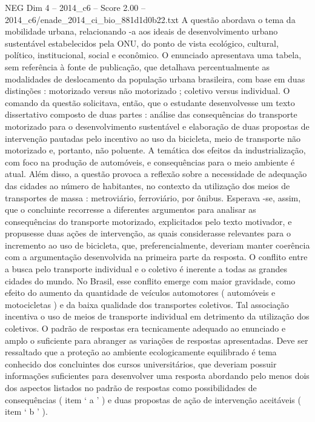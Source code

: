 \begin{textsample}{NEG Dim 4 – 2014\_c6 – Score 2.00 – 2014\_c6/enade\_2014\_ci\_bio\_881d1d0b22.txt}
A questão abordava o tema da mobilidade urbana, relacionando -a aos ideais de desenvolvimento urbano sustentável estabelecidos pela ONU, do ponto de vista ecológico, cultural, político, institucional, social e econômico.
O enunciado apresentava uma tabela, sem referência à fonte de publicação, que detalhava percentualmente as modalidades de deslocamento da população urbana brasileira, com base em duas distinções : motorizado versus não motorizado ; coletivo versus individual.
O comando da questão solicitava, então, que o estudante desenvolvesse um texto dissertativo composto de duas partes : análise das consequências do transporte motorizado para o desenvolvimento sustentável e elaboração de duas propostas de intervenção pautadas pelo incentivo ao uso da bicicleta, meio de transporte não motorizado e, portanto, não poluente.
A temática dos efeitos da industrialização, com foco na produção de automóveis, e consequências para o meio ambiente é atual.
Além disso, a questão provoca a reflexão sobre a necessidade de adequação das cidades ao número de habitantes, no contexto da utilização dos meios de transportes de massa : metroviário, ferroviário, por ônibus.
Esperava -se, assim, que o concluinte recorresse a diferentes argumentos para analisar as consequências do transporte motorizado, explicitados pelo texto motivador, e propusesse duas ações de intervenção, as quais considerasse relevantes para o incremento ao uso de bicicleta, que, preferencialmente, deveriam manter coerência com a argumentação desenvolvida na primeira parte da resposta.
O conflito entre a busca pelo transporte individual e o coletivo é inerente a todas as grandes cidades do mundo.
No Brasil, esse conflito emerge com maior gravidade, como efeito do aumento da quantidade de veículos automotores ( automóveis e motocicletas ) e da baixa qualidade dos transportes coletivos.
Tal associação incentiva o uso de meios de transporte individual em detrimento da utilização dos coletivos.
O padrão de respostas era tecnicamente adequado ao enunciado e amplo o suficiente para abranger as variações de respostas apresentadas.
Deve ser ressaltado que a proteção ao ambiente ecologicamente equilibrado é tema conhecido dos concluintes dos cursos universitários, que deveriam possuir informações suficientes para desenvolver uma resposta abordando pelo menos dois dos aspectos listados no padrão de respostas como possibilidades de consequências ( item ‘ a ’ ) e duas propostas de ação de intervenção aceitáveis ( item ‘ b ’ ).

\end{textsample}
